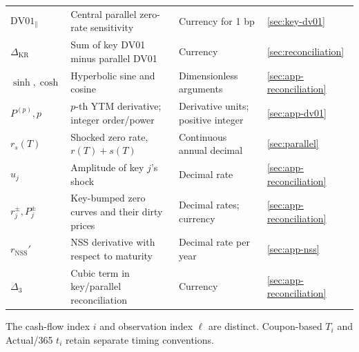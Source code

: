 \begin{longtable}{@{}L{0.18\textwidth}L{0.36\textwidth}L{0.18\textwidth}L{0.19\textwidth}@{}}
\(\mathrm{DV01}_{\parallel}\) & Central parallel zero-rate sensitivity & Currency for 1 bp & \ref{sec:key-dv01}\\
\(\Delta_{\mathrm{KR}}\) & Sum of key DV01 minus parallel DV01 & Currency & \ref{sec:reconciliation}\\
\(\sinh,\cosh\) & Hyperbolic sine and cosine & Dimensionless arguments & \ref{sec:app-reconciliation}\\
\(P^{(p)},p\) & \(p\)-th YTM derivative; integer order/power & Derivative units; positive integer & \ref{sec:app-dv01}\\
\(r_s(T)\) & Shocked zero rate, \(r(T)+s(T)\) & Continuous annual decimal & \ref{sec:parallel}\\
\(u_j\) & Amplitude of key \(j\)'s shock & Decimal rate & \ref{sec:app-reconciliation}\\
\(r_j^\pm,P_j^\pm\) & Key-bumped zero curves and their dirty prices & Decimal rates; currency & \ref{sec:app-reconciliation}\\
\(r_{\mathrm{NSS}}'\) & NSS derivative with respect to maturity & Decimal rate per year & \ref{sec:app-nss}\\
\(\Delta_3\) & Cubic term in key/parallel reconciliation & Currency & \ref{sec:app-reconciliation}\\
\end{longtable}
\endgroup
The cash-flow index \(i\) and observation index \(\ell\) are distinct.
Coupon-based \(T_i\) and Actual/365 \(t_i\) retain separate timing conventions.
